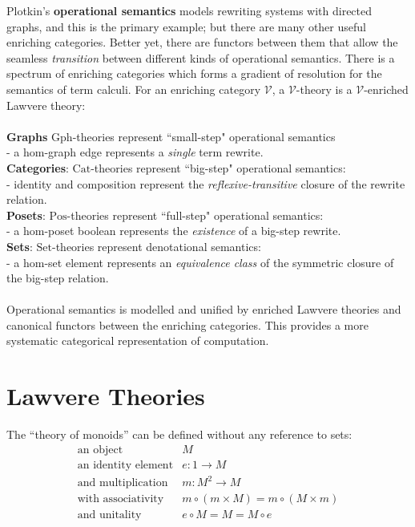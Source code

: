 \documentclass[a4paper,UKenglish]{article}
\newcommand{\Gph}{\mathrm{Gph}}
\newcommand{\Set}{\mathrm{Set}}
\newcommand{\Cat}{\mathrm{Cat}}
\newcommand{\Pos}{\mathrm{Pos}}
\newcommand{\V}{\mathscr{V}}
\begin{document}
Plotkin's \textbf{operational semantics} \cite{sos} models rewriting systems with directed graphs, and this is the primary example; but there are many other useful enriching categories. Better yet, there are functors between them that allow the seamless \textit{transition} between different kinds of operational semantics. There is a spectrum of enriching categories which forms a gradient of resolution for the semantics of term calculi. For an enriching category $\V$, a $\V$-theory is a $\V$-enriched Lawvere theory:\\\\
\textbf{Graphs} $\Gph$-theories represent ``small-step" operational semantics\\ - a hom-graph edge represents a \textit{single} term rewrite.\\
\textbf{Categories}: $\Cat$-theories represent ``big-step" operational semantics:\\ - identity and composition represent the \textit{reflexive-transitive} closure of the rewrite relation.\\
\textbf{Posets}: $\Pos$-theories represent ``full-step" operational semantics:\\ - a hom-poset boolean represents the \textit{existence} of a big-step rewrite.\\
\textbf{Sets}: $\Set$-theories represent denotational semantics:\\ - a hom-set element represents an \textit{equivalence class} of the symmetric closure of the big-step relation.\\\\
Operational semantics is modelled and unified by enriched Lawvere theories and canonical functors between the enriching categories. This provides a more systematic categorical representation of computation.

\section{Lawvere Theories}
The ``theory of monoids'' can be defined without any reference to sets:
\[\begin{array}{rl}
\text{an object} & M\\
\text{an identity element} & e:1 \to M\\
\text{and multiplication} & m: M^2 \to M\\
\text{with associativity} & m \circ (m \times M) = m \circ (M \times m)\\
\text{and unitality} & e \circ M = M = M \circ e\\
\end{array}\]
\end{document}
